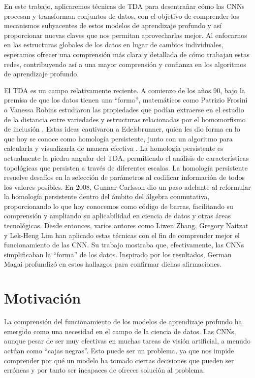En este trabajo, aplicaremos técnicas de TDA para desentrañar cómo las CNNs
procesan y transforman conjuntos de datos, con el objetivo de comprender los mecanismos
subyacentes de estos modelos de aprendizaje profundo y así proporcionar nuevas claves
que nos permitan aprovecharlas mejor. Al enfocarnos en las estructuras globales
de los datos en lugar de cambios individuales, esperamos ofrecer una comprensión
más clara y detallada de cómo trabajan estas redes, contribuyendo así a una
mayor comprensión y confianza en los algoritmos de aprendizaje profundo.

El TDA es un campo relativamente reciente. A comienzo de los años 90, bajo la
premisa de que los datos tienen una \enquote{forma}, matemáticos como Patrizio
Frosini o Vanessa Robins estudiaron las propiedades que podían extraerse en el
estudio de la distancia entre variedades \cite{Frosini_1990} y estructuras
relacionadas por el homomorfismo de inclusión \cite{robins1999towards}. Estas ideas
cautivaron a Edelsbrunner, quien les dio forma en lo que hoy se conoce como
homología persistente, junto con un algoritmo para calcularla y visualizarla de manera
efectiva \cite{edelsbrunner2002topological}. La homología persistente es
actualmente la piedra angular del TDA, permitiendo el análisis de características
topológicas que persisten a través de diferentes escalas. La homología
persistente resuelve desafíos en la selección de parámetros al codificar
información de todos los valores posibles. En 2008, Gunnar Carlsson
\cite{carlsson2009topology} dio un paso adelante al reformular la homología
persistente dentro del ámbito del álgebra conmutativa, proporcionando lo que hoy
conocemos como código de barras, facilitando su comprensión y ampliando su
aplicabilidad en ciencia de datos y otras áreas tecnológicas. Desde entonces,
varios autores como Liwen Zhang, Gregory Naitzat y Lek-Heng Lim \cite{naitzat2020topology}
han aplicado estas técnicas con el fin de comprender mejor el funcionamiento de las
CNN. Su trabajo mostraba que, efectivamente, las CNNs simplificaban la \enquote{forma}
de los datos. Inspirado por los resultados, German Magai \cite{magai2023deep} profundizó
en estos hallazgos para confirmar dichas afirmaciones.

\section{Motivación}

La comprensión del funcionamiento de los modelos de aprendizaje profundo ha
emergido como una necesidad en el campo de la ciencia de datos. Las CNNs, aunque
pesar de ser muy efectivas en muchas tareas de visión artificial, a menudo actúan
como \enquote{cajas negras}. Esto puede ser un problema, ya que nos impide
comprender por qué un modelo ha tomado ciertas decisiones que pueden ser
erróneas y por tanto ser incapaces de ofrecer solución al problema.

